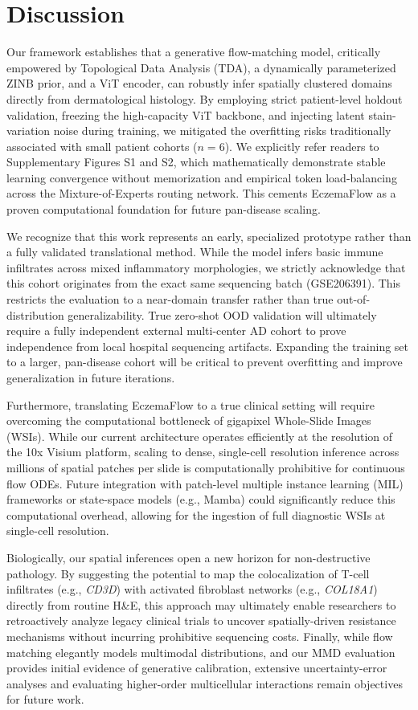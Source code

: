 \documentclass{bioinfo}
\begin{document}
\section{Discussion}

Our framework establishes that a generative flow-matching model, critically empowered by Topological Data Analysis (TDA), a dynamically parameterized ZINB prior, and a ViT encoder, can robustly infer spatially clustered domains directly from dermatological histology. By employing strict patient-level holdout validation, freezing the high-capacity ViT backbone, and injecting latent stain-variation noise during training, we mitigated the overfitting risks traditionally associated with small patient cohorts ($n=6$). We explicitly refer readers to Supplementary Figures S1 and S2, which mathematically demonstrate stable learning convergence without memorization and empirical token load-balancing across the Mixture-of-Experts routing network. This cements EczemaFlow as a proven computational foundation for future pan-disease scaling.

We recognize that this work represents an early, specialized prototype rather than a fully validated translational method. While the model infers basic immune infiltrates across mixed inflammatory morphologies, we strictly acknowledge that this cohort originates from the exact same sequencing batch (GSE206391). This restricts the evaluation to a near-domain transfer rather than true out-of-distribution generalizability. True zero-shot OOD validation will ultimately require a fully independent external multi-center AD cohort to prove independence from local hospital sequencing artifacts. Expanding the training set to a larger, pan-disease cohort will be critical to prevent overfitting and improve generalization in future iterations. 

Furthermore, translating EczemaFlow to a true clinical setting will require overcoming the computational bottleneck of gigapixel Whole-Slide Images (WSIs). While our current architecture operates efficiently at the resolution of the 10x Visium platform, scaling to dense, single-cell resolution inference across millions of spatial patches per slide is computationally prohibitive for continuous flow ODEs. Future integration with patch-level multiple instance learning (MIL) frameworks or state-space models (e.g., Mamba) could significantly reduce this computational overhead, allowing for the ingestion of full diagnostic WSIs at single-cell resolution.

Biologically, our spatial inferences open a new horizon for non-destructive pathology. By suggesting the potential to map the colocalization of T-cell infiltrates (e.g., \textit{CD3D}) with activated fibroblast networks (e.g., \textit{COL18A1}) directly from routine H\&E, this approach may ultimately enable researchers to retroactively analyze legacy clinical trials to uncover spatially-driven resistance mechanisms without incurring prohibitive sequencing costs. Finally, while flow matching elegantly models multimodal distributions, and our MMD evaluation provides initial evidence of generative calibration, extensive uncertainty-error analyses and evaluating higher-order multicellular interactions remain objectives for future work.
\end{document}
